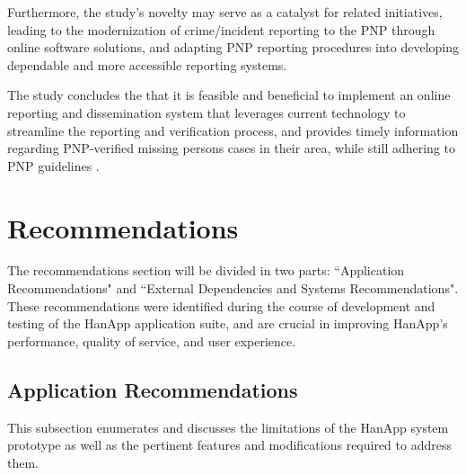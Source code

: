 Furthermore, the study's novelty may serve as a catalyst for related initiatives, leading to the modernization of crime/incident reporting to the PNP through online software solutions, and adapting PNP reporting procedures into developing dependable and more accessible reporting systems.

The study concludes the that it is feasible and beneficial to implement an online reporting and dissemination system that leverages current technology to streamline the reporting and verification process, and provides timely information regarding PNP-verified missing persons cases in their area, while still adhering to PNP guidelines .

\section{Recommendations}

The recommendations section will be divided in two parts: ``Application Recommendations" and ``External Dependencies and Systems Recommendations".  These recommendations were identified during the course of development and testing of the HanApp application suite, and are crucial in improving HanApp's performance, quality of service, and user experience.

\subsection{Application Recommendations}

This subsection enumerates and discusses the limitations of the HanApp system prototype as well as the pertinent features and modifications required to address them.

